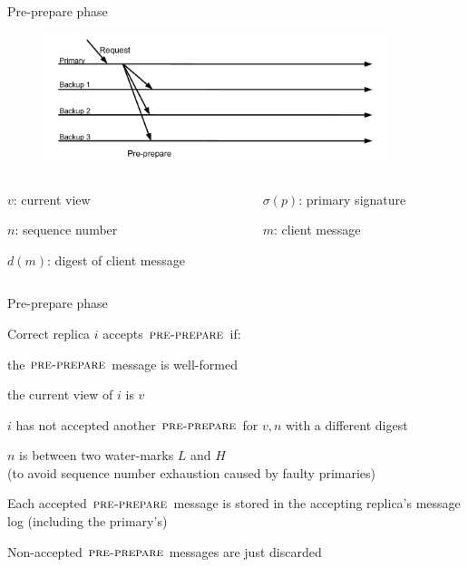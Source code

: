 \begin{frame}{Pre-prepare phase}

\begin{figure}
\includegraphics[width=0.9\textwidth, trim=0 20 0 60]{messages1}
\end{figure}
\begin{columns}
	\begin{column}{0.5\textwidth}
	\BI
	\item $v$: current view
	\item $n$: sequence number
	\item $d(m)$: digest of client message
	\EI
	\end{column}
	\begin{column}{0.5\textwidth}
	\BI
	\item $\sigma(p)$: primary signature
	\item $m$: client message
	\EI
	\end{column}
\end{columns}



\end{frame}


\begin{frame}{Pre-prepare phase}

\BIL
\item  Correct replica $i$ accepts $\textsc{pre-prepare}$ if:
\BI
	\item the $\textsc{pre-prepare}$ message is well-formed
	\item the current view of $i$ is $v$
	\item $i$ has not accepted another $\textsc{pre-prepare}$ for $v, n$ with a different digest
	\item $n$ is between two water-marks $L$ and $H$\\
			(to avoid sequence number exhaustion caused by faulty primaries)
	\EI
\item Each accepted $\textsc{pre-prepare}$ message is stored in the
accepting replica's message log (including the primary's)
\item Non-accepted $\textsc{pre-prepare}$ messages are just discarded
\EIL

\end{frame}

